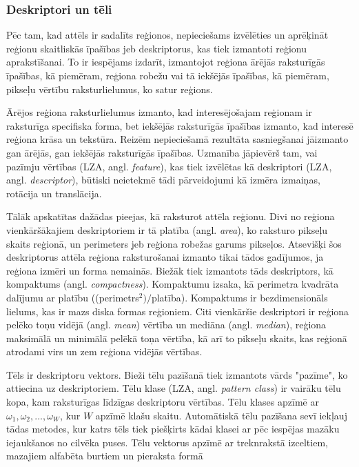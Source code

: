 \documentclass[12pt,paper=a4]{report}
\begin{document}
\subsubsection{Deskriptori un tēli}Pēc tam, kad attēls ir sadalīts reģionos, nepieciešams izvēlēties un aprēķināt reģionu skaitliskās īpašības jeb deskriptorus, kas tiek izmantoti reģionu aprakstīšanai. To ir iespējams izdarīt, izmantojot reģiona ārējās raksturīgās īpašības, kā piemēram, reģiona robežu vai tā iekšējās īpašības, kā piemēram, pikseļu vērtību raksturlielumus, ko satur reģions. \cite{gonzalez2002digital}\par
Ārējos reģiona raksturlielumus izmanto, kad interesējošajam reģionam ir raksturīga specifiska forma, bet iekšējās raksturīgās īpašības izmanto, kad interesē reģiona krāsa un tekstūra. Reizēm nepieciešamā rezultāta sasniegšanai jāizmanto gan ārējās, gan iekšējās raksturīgās īpašības. Uzmanība jāpievērš tam, vai pazīmju vērtības (LZA, angl. \textit{feature}), kas tiek izvēlētas kā deskriptori (LZA, angl. \textit{descriptor}), būtiski neietekmē tādi pārveidojumi kā izmēra izmaiņas, rotācija un translācija.  \cite{gonzalez2002digital}\par
Tālāk apskatītas dažādas pieejas, kā raksturot attēla reģionu. Divi no reģiona vienkāršākajiem deskriptoriem ir tā platība (angl. \textit{area}), ko raksturo pikseļu skaits reģionā, un perimeters jeb reģiona robežas garums pikseļos. Atsevišķi šos deskriptorus attēla reģiona raksturošanai izmanto tikai tādos gadījumos, ja reģiona izmēri un forma nemainās. Biežāk tiek izmantots tāds deskriptors, kā kompaktums (angl. \textit{compactness}). Kompaktumu izsaka, kā perimetra kvadrāta dalījumu ar platību ((perimetrs$^2)/$platība). Kompaktums ir bezdimensionāls lielums, kas ir mazs diska formas reģioniem. Citi vienkāršie deskriptori ir reģiona pelēko toņu vidējā (angl. \textit{mean}) vērtība un mediāna (angl. \textit{median}), reģiona maksimālā un minimālā pelēkā toņa vērtība, kā arī to pikseļu skaits, kas reģionā atrodami virs un zem reģiona vidējās vērtības. \cite{gonzalez2002digital}\par
Tēls ir deskriptoru vektors. Bieži tēlu pazīšanā tiek izmantots vārds "pazīme", ko attiecina uz deskriptoriem. Tēlu klase (LZA, angl. \textit{pattern class}) ir vairāku tēlu kopa, kam raksturīgas līdzīgas deskriptoru vērtības. Tēlu klases apzīmē ar $ \omega_1, \omega_2, ..., \omega_W $, kur $W$ apzīmē klašu skaitu. Automātiskā tēlu pazīšana sevī iekļauj tādas metodes, kur katrs tēls tiek piešķirts kādai klasei ar pēc iespējas mazāku iejaukšanos no cilvēka puses. Tēlu vektorus apzīmē ar treknrakstā izceltiem, mazajiem alfabēta burtiem un pieraksta formā 
\end{document}

